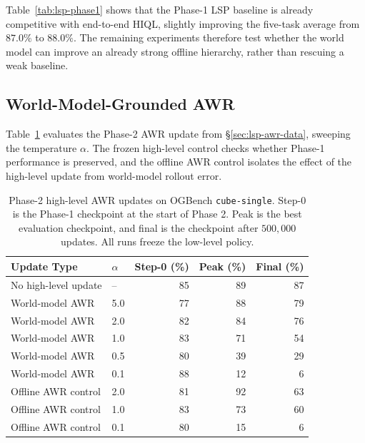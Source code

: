Table~\ref{tab:lsp-phase1} shows that the Phase-1 LSP baseline is
already competitive with end-to-end HIQL, slightly improving the
five-task average from $87.0\%$ to $88.0\%$. The remaining experiments
therefore test whether the world model can improve an already strong
offline hierarchy, rather than rescuing a weak baseline.

\subsection{World-Model-Grounded AWR}
\label{sec:exp-phase2-awr}

Table~\ref{tab:lsp-phase2-awr} evaluates the Phase-2 AWR update from
\S\ref{sec:lsp-awr-data}, sweeping the temperature $\alpha$. The frozen
high-level control checks whether Phase-1 performance is preserved, and
the offline AWR control isolates the effect of the high-level update
from world-model rollout error.

\begin{table}[h]
\centering
\caption{Phase-2 high-level AWR updates on OGBench
\texttt{cube-single}. Step-0 is the Phase-1 checkpoint at the start of
Phase 2. Peak is the best evaluation checkpoint, and final is the
checkpoint after $500{,}000$ updates. All runs freeze the low-level
policy.}
\label{tab:lsp-phase2-awr}
\begin{tabular}{llrrr}
\toprule
Update Type & $\alpha$ & Step-0 (\%) & Peak (\%) & Final (\%) \\
\midrule
No high-level update & --  & 85 & 89 & 87 \\
\midrule
World-model AWR & 5.0  & 77 & 88 & 79 \\
World-model AWR & 2.0  & 82 & 84 & 76 \\
World-model AWR & 1.0  & 83 & 71 & 54 \\
World-model AWR & 0.5  & 80 & 39 & 29 \\
World-model AWR & 0.1  & 88 & 12 & 6 \\
\midrule
Offline AWR control & 2.0  & 81 & 92 & 63 \\
Offline AWR control & 1.0  & 83 & 73 & 60 \\
Offline AWR control & 0.1  & 80 & 15 & 6 \\
\bottomrule
\end{tabular}
\end{table}

